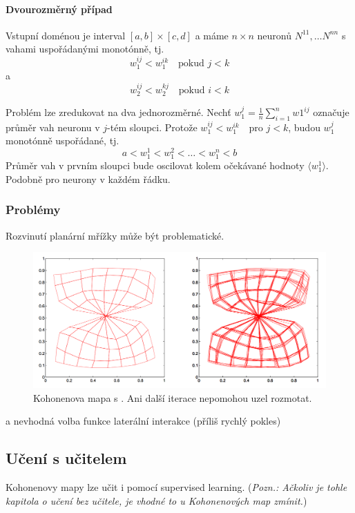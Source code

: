 \documentclass[11pt]{report} %
\numberwithin{equation}{section}
\begin{document}
\paragraph{Dvourozměrný případ}
Vstupní doménou je interval $[a,b] \times [c,d]$ a máme $n\times n$ neuronů $N^{11},\dots N^{nn}$ s vahami uspořádanými monotónně, tj. 
$$w_1^{ij} < w_1^{ik}\quad \text{pokud } j < k $$
a
$$w_2^{ij} < w_2^{kj}\quad \text{pokud } i < k $$

Problém lze zredukovat na dva jednorozměrné. Nechť $w_1^j = \frac{1}{n}\sum_{i=1}^{n}w1^{ij}$ označuje průměr vah neuronu v $j$-tém sloupci. Protože $w_1^{ij} < w_1^{ik}\quad \text{pro } j < k $, budou $w_1^j$ monotónně uspořádané, tj.
$$a < w_1^1 < w_1^2 < \dots < w_1^n < b$$
Průměr vah v prvním sloupci bude oscilovat kolem očekávané hodnoty $\langle w_1^1\rangle$. Podobně pro neurony v každém řádku.

\subsubsection{Problémy}
Rozvinutí planární mřížky může být problematické.
\begin{figure}[h]
	\centering
	\includegraphics[scale=0.7]{img/kohonen_knot.png}
	\caption{Kohonenova mapa s . Ani další iterace nepomohou uzel rozmotat.}
\end{figure}

 a nevhodná volba funkce laterální interakce (příliš rychlý pokles)


\subsection{Učení s učitelem}
Kohonenovy mapy lze učit i pomocí supervised learning. (\textit{Pozn.: Ačkoliv je tohle kapitola o učení bez učitele, je vhodné to u Kohonenových map zmínit.})
\end{document}
